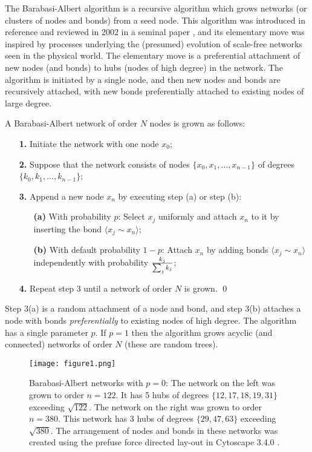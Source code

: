 \documentclass[12pt]{iopart}
\def\edge#1#2{{\langle #1{\sim}#2 \rangle}}
\def\sfrac#1#2{\hbox{\normalsize $\frac{#1}{#2}$}}
\begin{document}
The Barabasi-Albert algorithm is a recursive algorithm which grows networks (or
clusters of nodes and bonds) from a seed node.  This algorithm was introduced
in reference \cite{BA99} and reviewed in 2002 in a seminal paper \cite{AB02},
and its elementary move was inspired by processes underlying the (presumed) evolution
of scale-free networks seen in the physical world.  The elementary move is
a preferential attachment of new nodes (and bonds) to hubs (nodes of
high degree) in the network.  The algorithm is initiated by a single node,
and then new nodes and bonds are recursively attached, with new bonds preferentially
attached to existing nodes of large degree. 

A Barabasi-Albert network of order $N$ nodes is grown as follows:

\vspace{1mm}
\begin{enumerate}
\item[\bf 1.] Initiate the network with one node $x_0$;
\item[\bf 2.] Suppose that the network consists of nodes $\{x_0,x_1,\ldots,x_{n-1}\}$
of degrees $\{k_0,k_1,\ldots,k_{n-1}\}$;
\item[\bf 3.] Append a new node $x_n$ by executing step (a) or step (b):
\begin{enumerate}
\item[\bf (a)] With probability $p$: Select $x_j$ uniformly and attach $x_n$ to it by
inserting the bond $\edge{x_j}{x_n}$;
\item[\bf (b)] With default probability $1- p$: Attach $x_n$ by adding bonds
$\edge{x_j}{x_n}$ independently with probability $\sfrac{k_j}{\sum_j k_j}$;
\end{enumerate} 
\item[\bf 4.] Repeat step 3 until a network of order $N$ is grown.
\qed
\end{enumerate}
\vspace{5mm}

Step 3(a) is a random attachment of a node and bond, and step 3(b) attaches
a node with bonds \textit{preferentially} to existing nodes of high degree.
The algorithm has a single parameter $p$.  If $p=1$ then the algorithm grows
acyclic (and connected) networks of order $N$ (these are random trees).

\begin{figure}[t!]
 \centering
\texttt{[image: figure1.png]}
\caption{{Barabasi-Albert networks with $p=0$:}
The network on the left was grown to order $n=122$.  It has 5 hubs of degrees $\{12,17,18,19,31\}$
exceeding $\sqrt{122}$.  The network on the right was grown to order $n=380$.  This
network has 3 hubs of degrees $\{29,47,63 \}$ exceeding $\sqrt{380}$.  
The arrangement of nodes and bonds in these networks was created using 
the prefuse force directed lay-out in Cytoscape 3.4.0
\cite{Cytoscape}.}
\label{figure1}
\end{figure}
\end{document}

